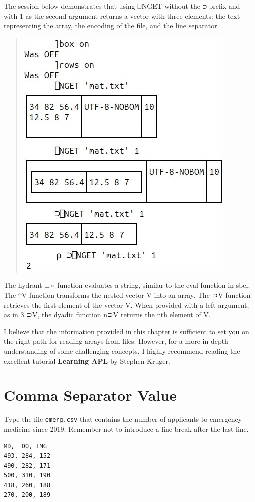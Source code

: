 \documentclass[a4paper,12pt]{book}
\begin{document}
\newpage
The session below demonstrates that
using ⎕NGET without the ⊃ prefix and
with 1 as the second argument returns
a vector with three elements: the text
representing the array, the encoding
of the file, and the line separator.
\begin{quote}
\includegraphics{srcfigs/nget-txt.jpg}
\end{quote}
The hydrant $\bot\!\!\!\!\circ$  function evaluates
a string, similar to the eval function in sbcl.
The ↑V function transforms the nested
vector V into an array. The ⊃V function retrieves
the first element of the vector V. When provided
with a left argument, as in 3 ⊃V, the dyadic
function n⊃V returns the nth element of V.

I believe that the information provided in
this chapter is sufficient to set you on the
right path for reading arrays from files. However,
for a more in-depth understanding of some
challenging concepts, I highly recommend
reading the excellent tutorial
\textbf{Learning APL} by Stephen Kruger.

\chapter{Comma Separator Value}
Type the file \verb|emerg.csv| that
contains the number of applicants
to emergency medicine since 2019.
Remember not to introduce a line
break after the last line.
\begin{verbatim}
MD,  DO, IMG
493, 284, 152
490, 282, 171
500, 310, 190
418, 260, 188
270, 200, 189
\end{verbatim}
\end{document}
